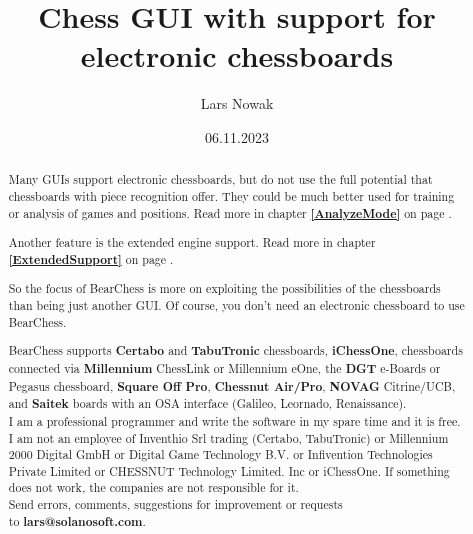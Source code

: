 \documentclass[11pt,a4paper]{article}
\title{Chess GUI with support for electronic chessboards}
\author{Lars Nowak}
\date{06.11.2023}
\begin{document}
\maketitle

\begin{abstract}

Many GUIs support electronic chessboards, but do not use the full potential that chessboards with piece recognition offer. They could be much better used for training or analysis of games and positions. Read more in chapter \textbf{\ref{AnalyzeMode}  } on page \pageref{AnalyzeMode}.

Another feature is the extended engine support. Read more in chapter \textbf{\ref{ExtendedSupport}  } on page \pageref{ExtendedSupport}.

So the focus of BearChess is more on exploiting the possibilities of the chessboards than being just another GUI. Of course, you don't need an electronic chessboard to use BearChess.

BearChess supports \textbf{Certabo} and \textbf{TabuTronic} chessboards, \textbf{iChessOne}, chessboards connected via \textbf{Millennium} ChessLink or Millennium eOne, the \textbf{DGT} e-Boards or Pegasus chessboard, \textbf{Square Off Pro}, \textbf{Chessnut Air/Pro}, \textbf{NOVAG} Citrine/UCB, and \textbf{Saitek} boards with an OSA interface (Galileo, Leornado, Renaissance).\\

I am a professional programmer and write the software in my spare time and it is free. I am not an employee of Inventhio Srl trading (Certabo, TabuTronic) or Millennium 2000 Digital GmbH or Digital Game Technology B.V. or Infivention Technologies Private Limited or CHESSNUT Technology Limited. Inc or iChessOne. If something does not work, the companies are not responsible for it.\\

Send errors, comments, suggestions for improvement or requests\\to \textbf{lars@solanosoft.com}.

\end{abstract}

\newpage
\tableofcontents
\newpage
\end{document}
